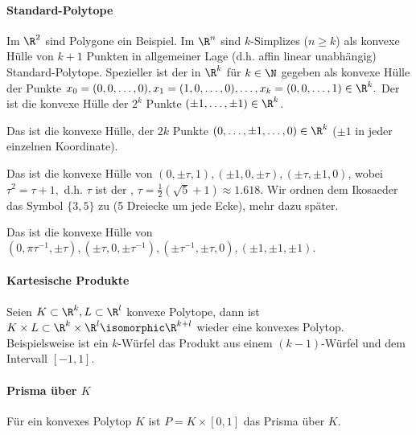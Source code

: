 \paragraph{Standard-Polytope}

Im $\R^2$ sind Polygone ein Beispiel.
Im $\R^n$ sind $k$-Simplizes ($n \ge k$) als konvexe Hülle von $k + 1$ Punkten in allgemeiner Lage (d.h. affin linear unabhängig) Standard-Polytope.
Spezieller ist der  in $\R^k$ für $k \in \N$ gegeben als konvexe Hülle der Punkte
\begin{math}
    x_0 = (0, 0, \dotsc, 0),
    x_1 = (1, 0, \dotsc, 0), \dotsc,
    x_k = (0, 0, \dotsc, 1) \in \R^k.
\end{math}
Der  ist die konvexe Hülle der $2^k$ Punkte $(\pm 1, \dotsc, \pm 1) \in \R^k$.

Das  ist die konvexe Hülle, der $2k$ Punkte $(0, \dotsc, \pm 1, \dotsc, 0) \in \R^k$ ($\pm 1$ in jeder einzelnen Koordinate).

Das  ist die konvexe Hülle von $(0,\pm \tau, 1), (\pm 1, 0, \pm \tau), (\pm \tau, \pm 1, 0)$, wobei
\begin{math}
    \tau^2 = \tau + 1,
\end{math}
d.h. $\tau$ ist der , $\tau = \frac{1}{2}(\sqrt 5 + 1) \approx 1.618$.
Wir ordnen dem Ikosaeder das Symbol $\{3,5\}$ zu (5 Dreiecke um jede Ecke), mehr dazu später.

Das  ist die konvexe Hülle von
\begin{math}
    (0, \pi \tau^{-1}, \pm \tau),
    (\pm \tau, 0, \pm \tau^{-1}),
    (\pm \tau^{-1}, \pm \tau, 0),
    (\pm 1, \pm 1, \pm 1).
\end{math}

\paragraph{Kartesische Produkte}
Seien $K \subset \R^k, L \subset \R^l$ konvexe Polytope, dann ist
\begin{math}
    K \times L \subset \R^k \times \R^l \isomorphic \R^{k+l}
\end{math}
wieder eine konvexes Polytop.
Beispielsweise ist ein $k$-Würfel das Produkt aus einem $(k-1)$-Würfel und dem Intervall $[-1,1]$.

\paragraph{Prisma über $K$}
Für ein konvexes Polytop $K$ ist $P = K \times [0,1]$ das Prisma über $K$.

